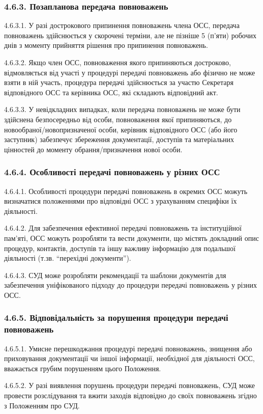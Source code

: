     \subsubsection*{4.6.3. Позапланова передача повноважень}
        4.6.3.1. У разі дострокового припинення повноважень члена ОСС, передача повноважень здійснюється у скорочені терміни, але не пізніше 5 (п'яти) робочих днів з моменту прийняття рішення про припинення повноважень.
        
        4.6.3.2. Якщо член ОСС, повноваження якого припиняються достроково, відмовляється від участі у процедурі передачі повноважень або фізично не може взяти в ній участь, процедура передачі здійснюється за участю Секретаря відповідного ОСС та керівника ОСС, які складають відповідний акт.
        
        4.6.3.3. У невідкладних випадках, коли передача повноважень не може бути здійснена безпосередньо від особи, повноваження якої припиняються, до новообраної/новопризначеної особи, керівник відповідного ОСС (або його заступник) забезпечує збереження документації, доступів та матеріальних цінностей до моменту обрання/призначення нової особи.

    \subsubsection*{4.6.4. Особливості передачі повноважень у різних ОСС}
        4.6.4.1. Особливості процедури передачі повноважень в окремих ОСС можуть визначатися положеннями про відповідні ОСС з урахуванням специфіки їх діяльності.
        
        4.6.4.2. Для забезпечення ефективної передачі повноважень та інституційної пам'яті, ОСС можуть розробляти та вести документи, що містять докладний опис процедур, контактів, доступів та іншу важливу інформацію для подальшої діяльності (т.зв. ``перехідні документи'').
        
        4.6.4.3. СУД може розробляти рекомендації та шаблони документів для забезпечення уніфікованого підходу до процедури передачі повноважень у різних ОСС.
        
    \subsubsection*{4.6.5. Відповідальність за порушення процедури передачі повноважень}
        4.6.5.1. Умисне перешкоджання процедурі передачі повноважень, знищення або приховування документації чи іншої інформації, необхідної для діяльності ОСС, вважається грубим порушенням цього Положення.
        
        4.6.5.2. У разі виявлення порушень процедури передачі повноважень, СУД може провести розслідування та вжити заходів відповідно до своїх повноважень згідно з Положенням про СУД.

